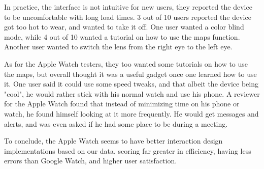 \documentclass[paper=a4, fontsize=11pt]{scrartcl}	%
\numberwithin{equation}{section}															%
\numberwithin{figure}{section}																%
\numberwithin{table}{section}																%
\begin{document}
\par In practice, the interface is not intuitive for new users, they reported the device to be uncomfortable with long load times. 3 out of 10 users reported the device got too hot to wear, and wanted to take it off. One user wanted a color blind mode, while 4 out of 10 wanted a tutorial on how to use the maps function. Another user wanted to switch the lens from the right eye to the left eye. \par
 As for the Apple Watch testers, they too wanted some tutorials on how to use the maps, but overall thought it was a useful gadget once one learned how to use it. One user said it could use some speed tweaks, and that albeit the device being "cool", he would rather stick with his normal watch and use his phone. A reviewer for the Apple Watch found that instead of minimizing time on his phone or watch, he found himself looking at it more frequently. He would get messages and alerts, and was even asked if he had some place to be during a meeting. \par
 
 To conclude, the Apple Watch seems to have better interaction design implementations based on our data, scoring far greater in efficiency, having less errors than Google Watch, and higher user satisfaction. 
\end{document}
